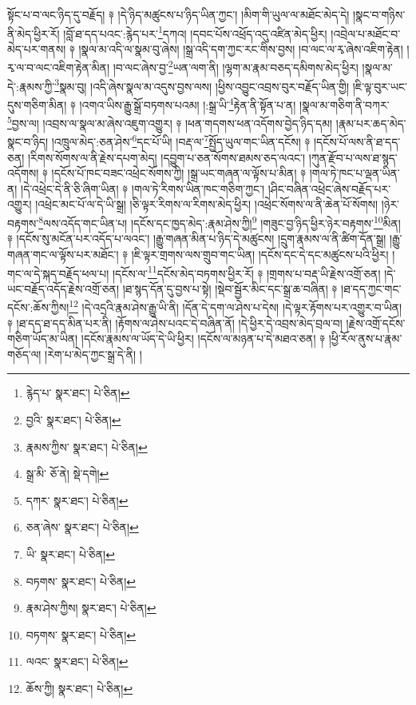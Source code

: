 སྟོང་པ་བ་ལང་ཉིད་དུ་བརྗོད། ༈ །དེ་ཉིད་མཚུངས་པ་ཉིད་ཡིན་ཀྱང་། །མིག་གི་ཡུལ་ལ་མཐོང་མེད་དེ། །སྣང་བ་གཉིས་ནི་མེད་ཕྱིར་རོ། །བློ་ཐ་དད་པའང་:རྙེད་པར་\footnote{རྙེད་པ་  སྣར་ཐང་།  པེ་ཅིན། }དཀའ། །དབང་པོས་འཕྲོད་འདུ་འཛིན་མེད་ཕྱིར། །འབྲེལ་པ་མཐོང་བ་མེད་པར་གནས། ༈ །སྣལ་མ་འདི་ལ་སྣམ་བུ་ཞེས། །སྒྲ་འདི་དག་ཀྱང་རང་གིས་བྱས། །བ་ལང་ལ་རྭ་ཞེས་འཇིག་རྟེན། །རྭ་ལ་བ་ལང་འཇིག་རྟེན་མིན། །བ་ལང་ཞེས་བྱ་\footnote{བྱའི་  སྣར་ཐང་།  པེ་ཅིན། }ཡན་ལག་ནི། །ལྷག་མ་རྣམ་བཅད་དམིགས་མེད་ཕྱིར། །སྣལ་མ་དེ་:རྣམས་ཀྱི་\footnote{རྣམས་ཀྱིས་  སྣར་ཐང་།  པེ་ཅིན། }སྣམ་བུ། །འདི་ཞེས་སྣལ་མ་འདུས་བྱས་ལས། །ཕྱིས་འབྱུང་འབྲས་བུར་བརྗོད་ཡིན་གྱི། །ཇི་ལྟ་བུར་ཡང་དུས་གཅིག་མིན། ༈ །འགའ་ཡིས་རྒྱུ་སྒྲོ་བཏགས་པའམ། །:སྒྲ་ཡི་\footnote{སྒྲ་མི་  ཅོ་ནེ།  སྡེ་དགེ། }རྟེན་ནི་སྟོན་པ་ན། །སྣལ་མ་གཅིག་ནི་བཀར་\footnote{དཀར་  སྣར་ཐང་།  པེ་ཅིན། }བྱས་ལ། །འབྲས་ལ་སྣལ་མ་ཞེས་འཇུག་འགྱུར། ༈ །ཕན་གདགས་ཕན་འདོགས་བྱེད་ཉིད་དམ། །རྣམ་པར་ཆད་མེད་སྣང་བ་ཉིད། །འཁྲུལ་མེད་:ཅན་ཤེས་\footnote{ཅན་ཞེས་  སྣར་ཐང་།  པེ་ཅིན། }དང་པོ་ཡི། །བརྡ་ལ་\footnote{ཡི་  སྣར་ཐང་།  པེ་ཅིན། }སྤྱོད་ཡུལ་གང་ཡིན་དངོས། ༈ །དངོས་པོ་ལས་ནི་ཐ་དད་ཅན། །རིགས་སོགས་ལ་ནི་རྗེས་དཔག་མེད། །དབྱུག་པ་ཅན་སོགས་ཐམས་ཅད་ལའང་། །ཀུན་རྫོབ་པ་ལས་ཐ་སྙད་འདོགས། ༈ །དངོས་པོ་ཁང་བཟང་འཕྲེང་སོགས་ཀྱི། །སྒྲ་ཡང་གཞན་ལ་ལྟོས་པ་མིན། ༈ །གལ་ཏེ་ཁང་པ་ལྡན་ཡིན་ན། །དེ་འཕྲེང་དེ་ནི་ཅི་ཞིག་ཡིན། ༈ །གལ་ཏེ་རིགས་ཡིན་ཁང་གཅིག་ཀྱང་། །ཤིང་བཞིན་འཕྲེང་ཞེས་བརྗོད་པར་འགྱུར། །འཕྲེང་མང་པོ་ལ་དེ་ཡི་སྒྲ། །ཅི་ལྟར་རིགས་ལ་རིགས་མེད་ཕྱིར། །འཕྲེང་སོགས་ལ་ནི་ཆེན་པོ་སོགས། །ཉེར་བརྟགས་\footnote{བཏགས་  སྣར་ཐང་།  པེ་ཅིན། }ལས་འདོད་གང་ཡིན་པ། །དངོས་དང་ཁྱད་མེད་:རྣམ་ཤེས་ཀྱི།\footnote{རྣམ་ཤེས་ཀྱིས།  སྣར་ཐང་།  པེ་ཅིན། } །གཟུང་བྱ་ཉིད་ཕྱིར་ཉེར་བརྟགས་\footnote{བཏགས་  སྣར་ཐང་།  པེ་ཅིན། }མིན། ༈ །དངོས་སུ་མངོན་པར་འདོད་པ་ལའང་། །རྒྱུ་གཞན་མིན་པ་ཉིད་དེ་མཚུངས། །དྲུག་རྣམས་ལ་ནི་ཚིག་དོན་སྒྲ། །རྒྱུ་གཞན་གང་ལ་ལྟོས་པར་མཐོང་། ༈ །ཇི་ལྟར་གྲགས་ལས་གྲུབ་གང་ཡིན། །དངོས་དང་དེ་དང་མཚུངས་པའི་ཕྱིར། །གང་ལ་དེ་སྐད་བརྗོད་ཕལ་པ། །དངོས་ལ་\footnote{ལའང་  སྣར་ཐང་།  པེ་ཅིན། }དངོས་མེད་བཏགས་ཕྱིར་རོ། ༈ །གྲགས་པ་བརྡ་ཡི་རྗེས་འགྲོ་ཅན། །དེ་ཡང་བརྗོད་འདོད་རྗེས་འགྲོ་ཅན། །ཐ་སྙད་དོན་དུ་བྱས་པ་སྟེ། །སྡེབ་སྦྱོར་མིང་དང་སྒྲ་ཆ་བཞིན། ༈ །ཐ་དད་ཀྱང་གང་དངོས་:ཆོས་ཀྱིས།\footnote{ཆོས་ཀྱི།  སྣར་ཐང་།  པེ་ཅིན། } །དེ་འདྲའི་རྣམ་ཤེས་རྒྱུ་ཡི་ནི། །དོན་དེ་དག་ལ་ཤེས་པ་དེས། །དེ་ལྟར་རྟོགས་པར་འགྱུར་བ་ཡིན། ༈ །ཐ་དད་ཐ་དད་མིན་པར་ནི། །རྟོགས་ལ་ཤེས་པའང་དེ་བཞིན་ནོ། །དེ་ཕྱིར་དེ་འབྲས་མེད་བྲལ་བ། །རྗེས་འགྲོ་དངོས་གཅིག་ཡོད་མ་ཡིན། །དངོས་རྣམས་ལ་ཡོད་དེ་ཡི་ཕྱིར། །དངོས་ལ་མཉན་པ་དེ་མཐའ་ཅན། ༈ །ཕྱི་རོལ་ནུས་པ་རྣམ་གཅོད་ལ། །རེག་པ་མེད་ཀྱང་སྒྲ་དེ་ནི། །
